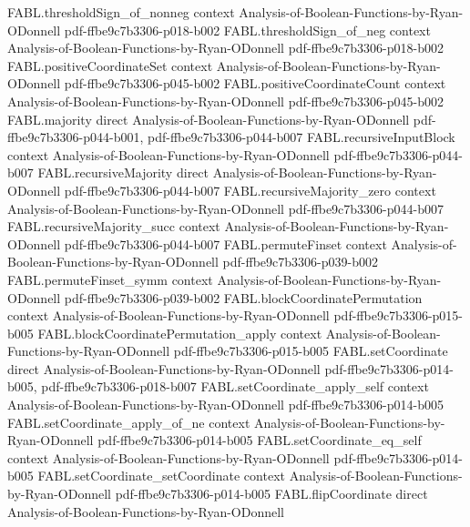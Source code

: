 \begin{theorem}
\proofstep
  {FABL.thresholdSign_of_nonneg}
  {context}
  {Analysis-of-Boolean-Functions-by-Ryan-ODonnell}
  {pdf-ffbe9c7b3306-p018-b002}
\proofstep
  {FABL.thresholdSign_of_neg}
  {context}
  {Analysis-of-Boolean-Functions-by-Ryan-ODonnell}
  {pdf-ffbe9c7b3306-p018-b002}
\proofstep
  {FABL.positiveCoordinateSet}
  {context}
  {Analysis-of-Boolean-Functions-by-Ryan-ODonnell}
  {pdf-ffbe9c7b3306-p045-b002}
\proofstep
  {FABL.positiveCoordinateCount}
  {context}
  {Analysis-of-Boolean-Functions-by-Ryan-ODonnell}
  {pdf-ffbe9c7b3306-p045-b002}
\proofstep
  {FABL.majority}
  {direct}
  {Analysis-of-Boolean-Functions-by-Ryan-ODonnell}
  {pdf-ffbe9c7b3306-p044-b001,
    pdf-ffbe9c7b3306-p044-b007}
\proofstep
  {FABL.recursiveInputBlock}
  {context}
  {Analysis-of-Boolean-Functions-by-Ryan-ODonnell}
  {pdf-ffbe9c7b3306-p044-b007}
\proofstep
  {FABL.recursiveMajority}
  {direct}
  {Analysis-of-Boolean-Functions-by-Ryan-ODonnell}
  {pdf-ffbe9c7b3306-p044-b007}
\proofstep
  {FABL.recursiveMajority_zero}
  {context}
  {Analysis-of-Boolean-Functions-by-Ryan-ODonnell}
  {pdf-ffbe9c7b3306-p044-b007}
\proofstep
  {FABL.recursiveMajority_succ}
  {context}
  {Analysis-of-Boolean-Functions-by-Ryan-ODonnell}
  {pdf-ffbe9c7b3306-p044-b007}
\proofstep
  {FABL.permuteFinset}
  {context}
  {Analysis-of-Boolean-Functions-by-Ryan-ODonnell}
  {pdf-ffbe9c7b3306-p039-b002}
\proofstep
  {FABL.permuteFinset_symm}
  {context}
  {Analysis-of-Boolean-Functions-by-Ryan-ODonnell}
  {pdf-ffbe9c7b3306-p039-b002}
\proofstep
  {FABL.blockCoordinatePermutation}
  {context}
  {Analysis-of-Boolean-Functions-by-Ryan-ODonnell}
  {pdf-ffbe9c7b3306-p015-b005}
\proofstep
  {FABL.blockCoordinatePermutation_apply}
  {context}
  {Analysis-of-Boolean-Functions-by-Ryan-ODonnell}
  {pdf-ffbe9c7b3306-p015-b005}
\proofstep
  {FABL.setCoordinate}
  {direct}
  {Analysis-of-Boolean-Functions-by-Ryan-ODonnell}
  {pdf-ffbe9c7b3306-p014-b005,
    pdf-ffbe9c7b3306-p018-b007}
\proofstep
  {FABL.setCoordinate_apply_self}
  {context}
  {Analysis-of-Boolean-Functions-by-Ryan-ODonnell}
  {pdf-ffbe9c7b3306-p014-b005}
\proofstep
  {FABL.setCoordinate_apply_of_ne}
  {context}
  {Analysis-of-Boolean-Functions-by-Ryan-ODonnell}
  {pdf-ffbe9c7b3306-p014-b005}
\proofstep
  {FABL.setCoordinate_eq_self}
  {context}
  {Analysis-of-Boolean-Functions-by-Ryan-ODonnell}
  {pdf-ffbe9c7b3306-p014-b005}
\proofstep
  {FABL.setCoordinate_setCoordinate}
  {context}
  {Analysis-of-Boolean-Functions-by-Ryan-ODonnell}
  {pdf-ffbe9c7b3306-p014-b005}
\proofstep
  {FABL.flipCoordinate}
  {direct}
  {Analysis-of-Boolean-Functions-by-Ryan-ODonnell}

\end{theorem}
